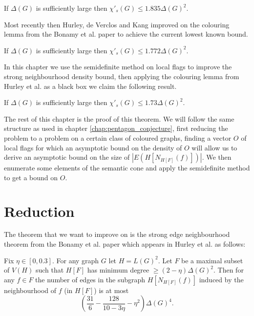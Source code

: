 \begin{knowntheorem}
    If $\Delta(G)$ is sufficiently large then
    $\chi'_s(G) \leq 1.835\Delta(G)^2$.
\end{knowntheorem}

Most recently then Hurley, de Verclos and Kang improved on the colouring lemma from the
Bonamy et al. paper to achieve the current lowest known bound.
\begin{knowntheorem}
    If $\Delta(G)$ is sufficiently large then
    $\chi'_s(G) \leq 1.772\Delta(G)^2$.
\end{knowntheorem}

In this chapter we use the semidefinite method on local flags to improve the strong
neighbourhood density bound, then applying the colouring lemma from Hurley et al. as a black
box we claim the following result.

\begin{theorem}
    \label{thm:strong_edge_colouring_bound}
    If $\Delta(G)$ is sufficiently large then $\chi'_s(G) \leq 1.73\Delta(G)^2$.
\end{theorem}

The rest of this chapter is the proof of this theorem.
We will follow the same structure as used in chapter \ref{chap:pentagon_conjecture},
first reducing the problem to a problem on a certain class of coloured graphs,
finding a vector $O$ of local flags for which an asymptotic bound on the density of $O$ will allow
us to derive an asymptotic bound on the size of $|E(H[N_{H[F]}(f)])|$.
We then enumerate some elements
of the semantic cone and apply the semidefinite method to get a bound on $O$.

\section{Reduction}
\label{sec:sec_reduction}

The theorem that we want to improve on is the strong edge neighbourhood theorem from
the Bonamy et al. paper which appears in Hurley et al. as follows:
\begin{knowntheorem}
    Fix $\eta \in [0, 0.3]$. For any graph $G$ let $H=L(G)^2$. Let $F$ be a
    maximal subset of $V(H)$ such that $H[F]$ has minimum degree
    $\geq (2-\eta)\Delta(G)^2$. Then for any $f\in F$ the number of edges in the subgraph
    $H[N_{H[F]}(f)]$ induced by the neighbourhood of $f$ (in $H[F]$) is at most
    \[
        \left(\frac{31}{6} - \frac{128}{10-3\eta} - \eta^2\right)\Delta(G)^4.
    \]
\end{knowntheorem}

